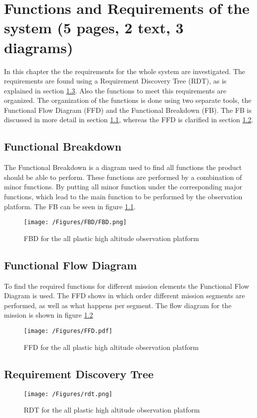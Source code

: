 \documentclass[a4paper]{report}
\begin{document}
\chapter{Functions and Requirements of the system (5 pages, 2 text, 3 diagrams)}\label{chap:Functions}
In this chapter the the requirements for the whole system are investigated. The requirements are found using a Requirement Discovery Tree (RDT), as is explained in section \ref{sec:RDT}. Also the functions to meet this requirements are organized. The organization of the functions is done using two separate tools, the Functional Flow Diagram (FFD) and the Functional Breakdown (FB). The FB is discussed in more detail in section \ref{sec:FB}, whereas the FFD is clarified in section \ref{sec:FFD}. 

\section{Functional Breakdown}\label{sec:FB}
The Functional Breakdown is a diagram used to find all functions the product should be able to perform. These functions are performed by a combination of minor functions. By putting all minor function under the corresponding major functions, which lead to the main function to be performed by the observation platform. The FB can be seen in figure \ref{fig:FBD}.

\begin{figure}[ht]
\texttt{[image: /Figures/FBD/FBD.png]}
\label{fig:FBD}
\caption{FBD for the all plastic high altitude observation platform}
\end{figure}

\section{Functional Flow Diagram}\label{sec:FFD}
To find the required functions for different mission elements the Functional Flow Diagram is used. The FFD shows in which order different mission segments are performed, as well as what happens per segment. The flow diagram for the mission is shown in figure \ref{fig:FFD}

\begin{figure}[ht]
\texttt{[image: /Figures/FFD.pdf]}
\label{fig:FFD}
\caption{FFD for the all plastic high altitude observation platform}
\end{figure}

\section{Requirement Discovery Tree}\label{sec:RDT}


\begin{figure}
\texttt{[image: /Figures/rdt.png]}
\label{fig:RDT}
\caption{RDT for the all plastic high altitude observation platform}
\end{figure}
\end{document}
